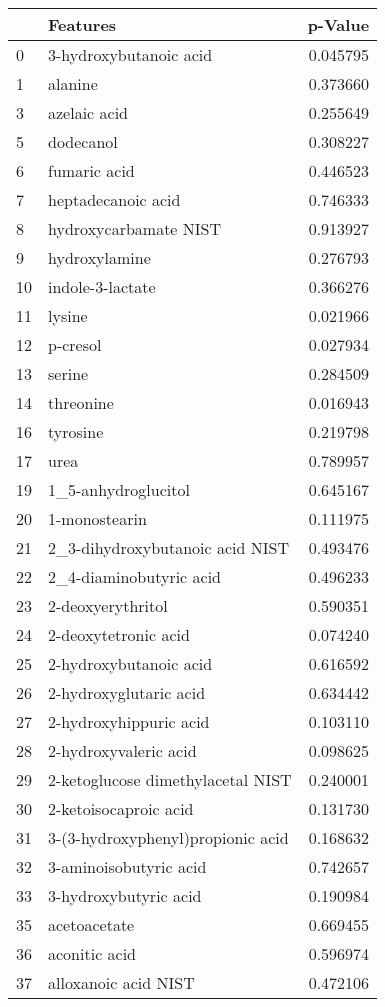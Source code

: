 \begin{tabular}{llr}
\toprule
 & Features & p-Value \\
\midrule
0 & 3-hydroxybutanoic acid & 0.045795 \\
1 & alanine & 0.373660 \\
3 & azelaic acid & 0.255649 \\
5 & dodecanol & 0.308227 \\
6 & fumaric acid & 0.446523 \\
7 & heptadecanoic acid & 0.746333 \\
8 & hydroxycarbamate NIST & 0.913927 \\
9 & hydroxylamine & 0.276793 \\
10 & indole-3-lactate & 0.366276 \\
11 & lysine & 0.021966 \\
12 & p-cresol & 0.027934 \\
13 & serine & 0.284509 \\
14 & threonine & 0.016943 \\
16 & tyrosine & 0.219798 \\
17 & urea & 0.789957 \\
19 & 1_5-anhydroglucitol & 0.645167 \\
20 & 1-monostearin & 0.111975 \\
21 & 2_3-dihydroxybutanoic acid NIST & 0.493476 \\
22 & 2_4-diaminobutyric acid & 0.496233 \\
23 & 2-deoxyerythritol & 0.590351 \\
24 & 2-deoxytetronic acid & 0.074240 \\
25 & 2-hydroxybutanoic acid & 0.616592 \\
26 & 2-hydroxyglutaric acid & 0.634442 \\
27 & 2-hydroxyhippuric acid & 0.103110 \\
28 & 2-hydroxyvaleric acid & 0.098625 \\
29 & 2-ketoglucose dimethylacetal NIST & 0.240001 \\
30 & 2-ketoisocaproic acid & 0.131730 \\
31 & 3-(3-hydroxyphenyl)propionic acid & 0.168632 \\
32 & 3-aminoisobutyric acid & 0.742657 \\
33 & 3-hydroxybutyric acid & 0.190984 \\
35 & acetoacetate & 0.669455 \\
36 & aconitic acid & 0.596974 \\
37 & alloxanoic acid NIST & 0.472106 \\

\end{tabular}
